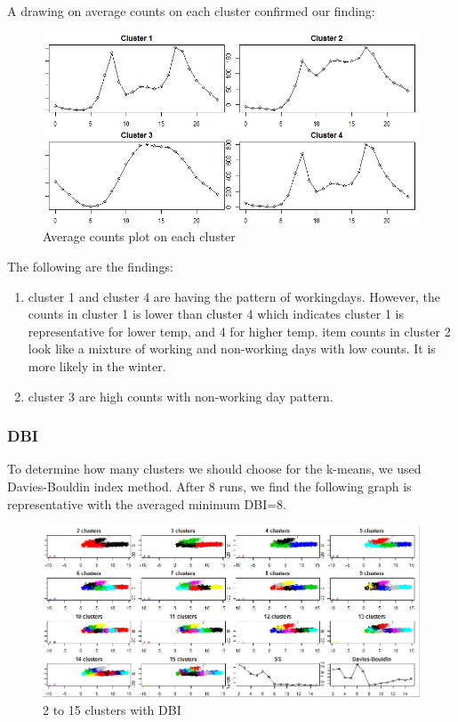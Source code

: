 \documentclass[12pt]{article}
\begin{document}
A drawing on average counts on each cluster confirmed our finding:
	\begin{figure}[H]
		\centering
		\includegraphics[scale=.65]{figures/kmeans_clusters.png}
		\caption{Average counts plot on each cluster}
	\end{figure}
The following are the findings:
\begin{enumerate}
	\item cluster 1 and cluster 4 are having the pattern of workingdays. However, the counts in cluster 1 is lower than cluster 4 which indicates cluster 1 is representative for lower temp, and 4 for higher temp.
	item counts in cluster 2 look like a mixture of working and non-working days with low counts. It is more likely in the winter.
	\item cluster 3 are high counts with non-working day pattern.
\end{enumerate}

\subsubsection{DBI}
To determine how many clusters we should choose for the k-means, we used Davies-Bouldin index method. After 8 runs, we find the following graph is representative with the averaged minimum DBI=8.
	\begin{figure}[H]
		\centering
		\includegraphics[scale=.65]{figures/dbi_8.png}
		\caption{2 to 15 clusters with DBI}
	\end{figure}
	
\end{document}
